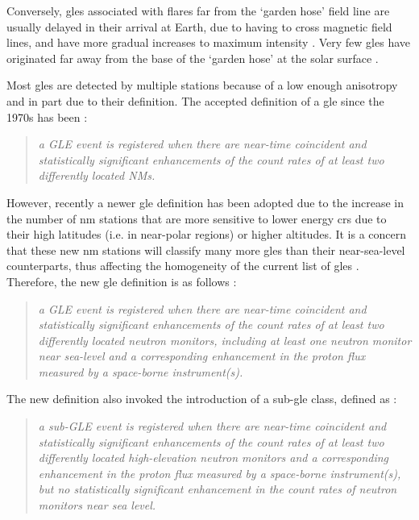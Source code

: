 Conversely, \glspl{gle} associated with flares far from the `garden hose' field line are usually delayed in their arrival at Earth, due to having to cross magnetic field lines, and have more gradual increases to maximum intensity \citep{duldig_ground_1993}. Very few \glspl{gle} have originated far away from the base of the `garden hose' at the solar surface \citep{duldig_ground_1993, andriopoulou_intense_2011}.

Most \glspl{gle} are detected by multiple stations because of a low enough anisotropy \citep{strauss_pulse_2017,belov_global_2018} and in part due to their definition. The accepted definition of a \gls{gle} since the 1970s has been \citep{poluianov_gle_2017}: 

\begin{quote}
	\textit{a GLE event is registered when there are near-time coincident and statistically significant enhancements of the count rates of at least two differently located NMs.}
\end{quote}

However, recently a newer \gls{gle} definition has been adopted due to the increase in the number of \gls{nm} stations that are more sensitive to lower energy \glspl{cr} due to their high latitudes (i.e. in near-polar regions) or higher altitudes. It is a concern that these new \gls{nm} stations will classify many more \glspl{gle} than their near-sea-level counterparts, thus affecting the homogeneity of the current list of \glspl{gle} \citep{poluianov_gle_2017}. Therefore, the new \gls{gle} definition is as follows \citep{poluianov_gle_2017}: 

\begin{quote}
	\textit{a GLE event is registered when there are near-time coincident and statistically significant enhancements of the count rates of at least two differently located neutron monitors, including at least one neutron monitor near sea-level and a corresponding enhancement in the proton flux measured by a space-borne instrument(s).}
\end{quote}

The new definition also invoked the introduction of a sub-\gls{gle} class, defined as \citep{poluianov_gle_2017}:

\begin{quote}
	\textit{a sub-GLE event is registered when there are near-time coincident and statistically significant enhancements of the count rates of at least two differently located high-elevation neutron monitors and a corresponding enhancement in the proton flux measured by a space-borne instrument(s), but no statistically significant enhancement in the count rates of neutron monitors near sea level.}
\end{quote}


